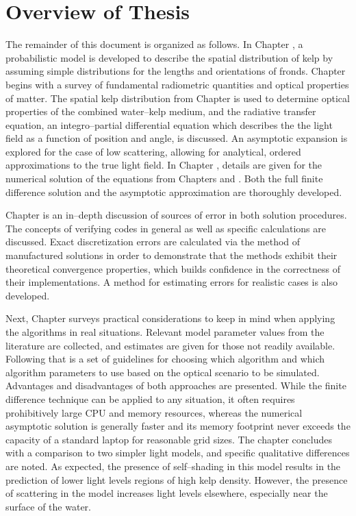 \section{Overview of Thesis}
The remainder of this document is organized as follows.
In Chapter \Rom{\ref{chap:kelp}}, a probabilistic model is developed to describe the spatial distribution of kelp by assuming simple distributions for the lengths and orientations of fronds.
Chapter \Rom{\ref{chap:light}} begins with a survey of fundamental radiometric quantities and optical properties of matter.
The spatial kelp distribution from Chapter \Rom{\ref{chap:kelp}} is used to determine optical properties of the combined water--kelp medium,
and the radiative transfer equation, an integro--partial differential equation which describes the the light field as a function of position and angle, is discussed.
An asymptotic expansion is explored for the case of low scattering, allowing for analytical, ordered approximations to the true light field.
In Chapter \Rom{\ref{chap:numerical}}, details are given for the numerical solution of the equations from Chapters \Rom{\ref{chap:kelp}} and \Rom{\ref{chap:light}}.
Both the full finite difference solution and the asymptotic approximation are thoroughly developed.

Chapter \Rom{\ref{chap:model_analysis}} is an in--depth discussion of sources of error in both solution procedures.
The concepts of verifying codes in general as well as specific calculations are discussed.
Exact discretization errors are calculated via the method of manufactured solutions in order to demonstrate
that the methods exhibit their theoretical convergence properties, which builds confidence in the correctness of their implementations.
A method for estimating errors for realistic cases is also developed.

Next, Chapter \Rom{\ref{chap:application}} surveys practical considerations to keep in mind when applying the algorithms in real situations.
Relevant model parameter values from the literature are collected, and estimates are given for those not readily available.
Following that is a set of guidelines for choosing which algorithm and which algorithm parameters to use based on the optical scenario to be simulated.
Advantages and disadvantages of both approaches are presented.
While the finite difference technique can be applied to any situation, it often requires prohibitively large CPU and memory resources, whereas the numerical asymptotic solution is generally faster and its memory footprint never exceeds the capacity of a standard laptop for reasonable grid sizes.
The chapter concludes with a comparison to two simpler light models, and specific qualitative differences are noted.
As expected, the presence of self--shading in this model results in the prediction of lower light levels regions of high kelp density.
However, the presence of scattering in the model increases light levels elsewhere, especially near the surface of the water.

